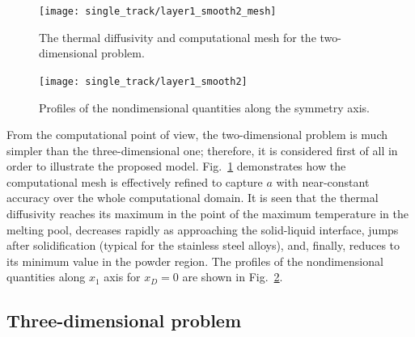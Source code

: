 \documentclass{article}
\begin{document}
\begin{figure}
    \centering
    \texttt{[image: single\_track/layer1\_smooth2\_mesh]}
    \caption{
        The thermal diffusivity and computational mesh for the two-dimensional problem.
    }\label{fig:2d:mesh}
\end{figure}

\begin{figure}
    \centering
    \texttt{[image: single\_track/layer1\_smooth2]}
    \caption{
        Profiles of the nondimensional quantities along the symmetry axis.
    }\label{fig:2d:profiles}
\end{figure}

From the computational point of view, the two-dimensional problem is much simpler than the three-dimensional one;
therefore, it is considered first of all in order to illustrate the proposed model.
Fig.~\ref{fig:2d:mesh} demonstrates how the computational mesh is effectively refined
to capture \(a\) with near-constant accuracy over the whole computational domain.
It is seen that the thermal diffusivity reaches its maximum in the point of the maximum temperature in the melting pool,
decreases rapidly as approaching the solid-liquid interface, jumps after solidification (typical for the stainless steel alloys),
and, finally, reduces to its minimum value in the powder region.
The profiles of the nondimensional quantities along \(x_1\) axis for \(x_D=0\) are shown in Fig.~\ref{fig:2d:profiles}.

\subsection{Three-dimensional problem}
\end{document}
